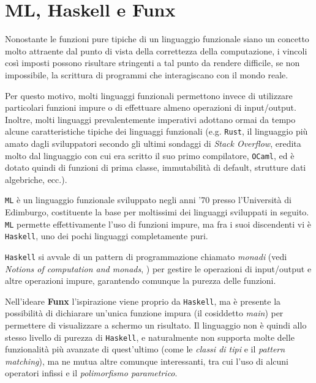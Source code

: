 \section{ML, Haskell e Funx}
\label{sec:2-ml-haskell-funx}

Nonostante le funzioni pure tipiche di un linguaggio funzionale siano un concetto molto attraente
dal punto di vista della correttezza della computazione, i vincoli così imposti possono risultare
stringenti a tal punto da rendere difficile, se non impossibile, la scrittura di programmi che
interagiscano con il mondo reale.

Per questo motivo, molti linguaggi funzionali permettono invece di utilizzare particolari funzioni
impure o di effettuare almeno operazioni di input/output. Inoltre, molti linguaggi prevalentemente
imperativi adottano ormai da tempo alcune caratteristiche tipiche dei linguaggi funzionali
(e.g. \texttt{Rust}, il linguaggio più amato dagli sviluppatori secondo gli ultimi sondaggi di \textit{Stack Overflow},
eredita molto dal linguaggio con cui era scritto il suo primo compilatore, \texttt{OCaml}, ed è dotato quindi di
funzioni di prima classe, immutabilità di default, strutture dati algebriche, ecc.).


\texttt{ML} è un linguaggio funzionale sviluppato negli anni '70 presso l'Università di Edimburgo,
costituente la base per moltissimi dei linguaggi sviluppati in seguito.
\texttt{ML} permette effettivamente l'uso di funzioni impure, ma fra i suoi discendenti
vi è \texttt{Haskell}, uno dei pochi linguaggi completamente puri.

\noindent \texttt{Haskell} si avvale di un pattern di programmazione chiamato \textit{monadi}
(vedi \textit{Notions of computation and monads}, \cite{Monads}) per gestire
le operazioni di input/output e altre operazioni impure, garantendo comunque la purezza delle funzioni.


Nell'ideare \textbf{Funx} l'ispirazione viene proprio da \texttt{Haskell}, ma è presente la possibilità
di dichiarare un'unica funzione impura (il cosiddetto \textit{main}) per permettere di visualizzare a schermo un risultato.
Il linguaggio non è quindi allo stesso livello di purezza di \texttt{Haskell}, e naturalmente non supporta
molte delle funzionalità più avanzate di quest'ultimo (come le \textit{classi di tipi} e il \textit{pattern matching}),
ma ne mutua altre comunque interessanti, tra cui l'uso di alcuni operatori infissi e il \textit{polimorfismo parametrico}.